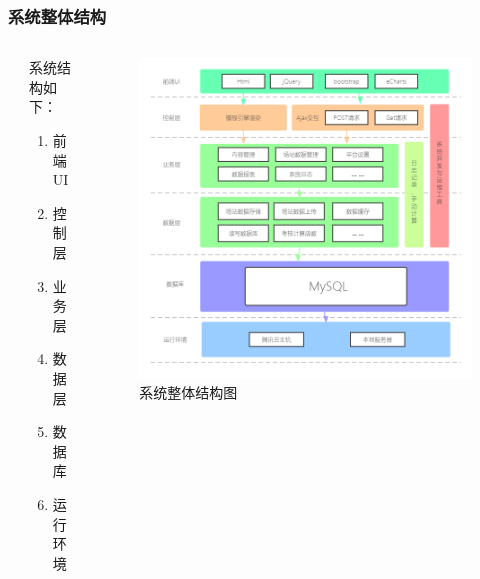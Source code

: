 \documentclass[aspectratio=43, 10pt, utf8, mathserif]{beamer}
\begin{document}
		\begin{frame}
		\frametitle{系统整体结构}
		
		\begin{columns}
			\begin{column}{.05\linewidth}
			
			\end{column}
			\begin{column}{.35\linewidth}
				系统结构如下：
				\begin{enumerate}
					\item 前端UI
					\item 控制层
					\item 业务层
					\item 数据层
					\item 数据库
					\item 运行环境
				\end{enumerate}
			\end{column}
			
			\begin{column}{.6\linewidth}
					\begin{figure}[H]
					\centering
					\includegraphics[width=0.93\linewidth]{pic/系统框架结构}
					\caption{系统整体结构图}
					\label{电力系统网源协调控制系统整体结构图}
				\end{figure}
			\end{column}
		\end{columns}
	\end{frame}
\end{document}
